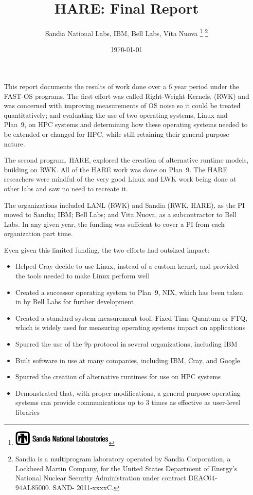 \documentclass{report}
\title{HARE: Final Report}
\author{Sandia National Labs, IBM, Bell Labs, Vita Nuova
\thanks{\protect\includegraphics[height=0.3in]{thunderchicken}%
}%
\thanks{Sandia is a multiprogram laboratory operated by Sandia Corporation, a Lockheed Martin Company, for the United States Department of Energy’s National Nuclear Security Administration under contract DE­AC04­94AL85000. SAND- 2011-xxxxC.}  
}
\date{\today}
\begin{document}
\maketitle
\tableofcontents
\pagebreak

This report documents the results of work done over a 6 year period under the FAST-OS 
programs. The first effort was called Right-Weight Kernels, (RWK) and was concerned with 
improving measurements of OS noise so it could be treated quantitatively; 
and evaluating the use of two operating systems, Linux
and Plan~9, on HPC systems and determining how these operating systems needed
to be extended or changed for HPC, while still retaining their general-purpose nature. 

The second program, HARE, explored the creation of alternative runtime models, 
building on RWK. All of the HARE work was done on Plan~9. The HARE reseachers
were mindful of the very good Linux and LWK work being done at other labs and saw no
need to recreate it. 

The organizations included LANL (RWK) and Sandia (RWK, HARE), as the PI moved to Sandia; 
IBM; Bell Labs; and Vita Nuova, as a subcontractor to Bell Labs. In any given year, 
the funding was suffcient to cover a PI from each organization part time. 

Even given this limited funding, the two efforts had outsized impact: 
\begin{itemize}
\item Helped Cray decide to use Linux, instead of a custom kernel, and provided
the tools needed to make Linux perform well
\item Created a successor operating system to Plan~9, NIX, which has been taken in 
by Bell Labs for further development
\item Created a standard system measurement tool, Fixed Time Quantum or FTQ, which is widely
used for measuring operating systems impact on applications
\item Spurred the use of the 9p protocol in several organizations, including IBM
\item Built software in use at many companies, including IBM, Cray, and Google
\item Spurred the creation of alternative runtimes for use on HPC systems
\item Demonstrated that, with proper modifications, a general purpose operating systems
can provide communications up to 3 times as effective as user-level libraries
\end{itemize}
\end{document}
